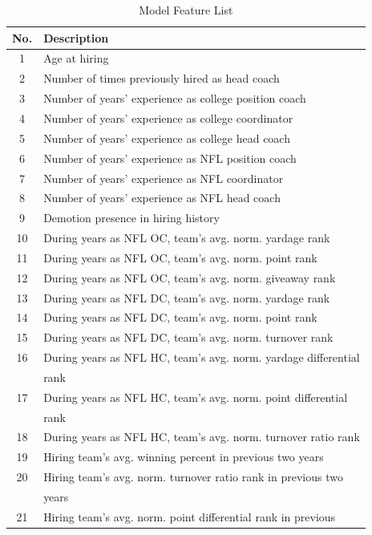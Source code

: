 \documentclass[conference]{IEEEtran}
\begin{document}
\begin{table}[htbp]
\caption{Model Feature List}
\begin{center}
\begin{tabular}{|c||l|}
\hline
\textbf{No.} & \textbf{Description} \\
\hline
\hline
1 & Age at hiring \\
\hline
2 & Number of times previously hired as head coach \\
\hline
3 & Number of years’ experience as college position coach \\
\hline
4 & Number of years’ experience as college coordinator \\
\hline
5 & Number of years’ experience as college head coach \\
\hline
6 & Number of years’ experience as NFL position coach \\
\hline
7 & Number of years’ experience as NFL coordinator \\
\hline
8 & Number of years’ experience as NFL head coach \\
\hline
9 & Demotion presence in hiring history \\
\hline
10 & During years as NFL OC, team’s avg. norm. yardage rank \\
\hline
11 & During years as NFL OC, team’s avg. norm. point rank \\
\hline
12 & During years as NFL OC, team’s avg. norm. giveaway rank \\
\hline
13 & During years as NFL DC, team’s avg. norm. yardage rank \\
\hline
14 & During years as NFL DC, team’s avg. norm. point rank \\
\hline
15 & During years as NFL DC, team’s avg. norm. turnover rank \\
\hline
16 & During years as NFL HC, team’s avg. norm. yardage differential\\
&rank \\
\hline
17 & During years as NFL HC, team’s avg. norm. point differential \\
&rank \\
\hline
18 & During years as NFL HC, team’s avg. norm. turnover ratio rank \\
\hline
19 & Hiring team’s avg. winning percent in previous two years \\
\hline
20 & Hiring team’s avg. norm. turnover ratio rank in previous two \\
&years \\
\hline
21 & Hiring team’s avg. norm. point differential rank in previous\\

\end{tabular}
\end{center}
\end{table}
\end{document}
